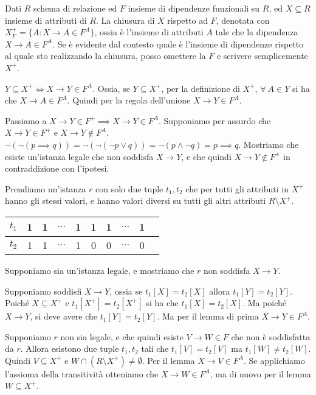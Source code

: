 \begin{defn}
Dati $R$ schema di relazione ed $F$ insieme di dipendenze funzionali su $R$, ed $X \subseteq R$ insieme di attributi di $R$. La chiusura di $X$ rispetto ad $F$, denotata con $X_F^+ = \{ A : X \to A \in F^A\}$, ossia \`e l'insieme di attributi $A$ tale che la dipendenza $X \to A \in F^A$. Se \`e evidente dal contesto quale \`e l'insieme di dipendenze rispetto al quale sto realizzando la chiusura, posso omettere la $F$ e scrivere semplicemente $X^+$.
\begin{lem}\label{chiusura_attributi}
$Y \subseteq X^+ \iff X \to Y \in F^A$. Ossia, se $Y \subseteq X^+$, per la definizione di $X^+$, $\forall \ A \in Y$ si ha che $X \to A \in F^A$. Quindi per la regola dell'unione $X \to Y \in F^A$.
\end{lem}
\end{defn}

Passiamo a $X \to Y \in F^+ \implies X \to Y \in F^A$.
Supponiamo per assurdo che $X \to Y \in F^+$ e $X \to Y \notin F^A$. $\neg ( \neg ( p \implies q)) = \neg ( \neg ( \neg p \lor q)) = \neg (p \land \neg q) = p \implies q$. Mostriamo che esiste un'istanza legale che non soddisfa $X \to Y$, e che quindi $X \to Y \notin F^+$ in contraddizione con l'ipotesi.

Prendiamo un'istanza $r$ con solo due tuple $t_1, t_2$ che per tutti gli attributi in $X^+$ hanno gli stessi valori, e hanno valori diversi su tutti gli altri attributi $R \setminus X^+$.

\begin{tabular}{|l |*{9}{c|}}
\hline
$t_1$ & 1 & 1 & $\dots$ & 1 & 1 & 1 & $\dots$ & 1 \\
\hline
$t_2$ & 1 & 1 & $\dots$ & 1 & 0 & 0 & $\dots$ & 0 \\
\hline 
\end{tabular}

Supponiamo sia un'istanza legale, e mostriamo che $r$ non soddisfa $X \to Y$.

Supponiamo soddisfi $X \to Y$, ossia se $t_1[X] = t_2[X]$ allora $t_1[Y] = t_2[Y]$. Poich\'e $X \subseteq X^+$ e $t_1[X^+] = t_2[X^+]$ si ha che $t_1[X] = t_2[X]$. Ma poich\'e $X \to Y$, si deve avere che $t_1[Y] = t_2[Y]$. Ma per il lemma di prima $X \to Y \in F^A$.

Supponiamo $r$ non sia legale, e che quindi esiste $V \to W \in F$ che non \`e soddisfatta da $r$. Allora esistono due tuple $t_1, t_2$ tali che $t_1[V] = t_2[V]$ ma $t_1[W] \neq t_2[W]$. Quindi $V \subseteq X^+$ e $W \cap (R \setminus X^+) \neq \emptyset$. Per il lemma $X \to V \in F^A$. Se applichiamo l'assioma della transitivit\`a otteniamo che $X \to W \in F^A$, ma di nuovo per il lemma $W \subseteq X^+$.

